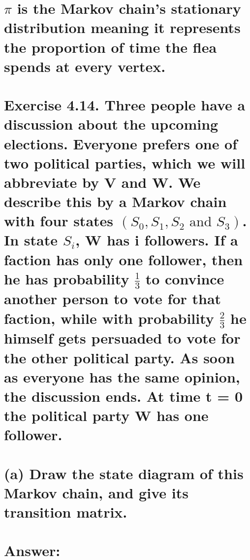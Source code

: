 \documentclass[11px]{article}
\begin{document}
\section*{$\pi$ is the Markov chain's stationary distribution meaning it represents the proportion of time the flea spends at every vertex.}

\section*{Exercise 4.14. \normalfont Three people have a discussion about the upcoming elections. Everyone prefers one of two political parties, which we will abbreviate by V and W. We describe this by a Markov chain with four states $(S_0, S_1, S_2 \text{ and } S_3)$. In state $S_i$, W has i followers. If a faction has only one follower, then he has probability $\frac{1}{3}$ to convince another person to vote for that faction, while with probability $\frac{2}{3}$ he himself gets persuaded to vote for the other political party. As soon as everyone has the same opinion, the discussion ends. At time t = 0 the political party W has one follower.}

\section*{\normalfont (a) Draw the state diagram of this Markov chain, and give its transition matrix.}

\section*{Answer: }

\begin{center}
\end{center}
\end{document}
